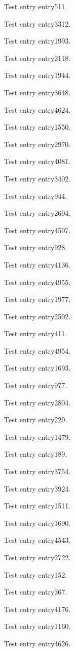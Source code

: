 Test entry \gls{entry511}.

Test entry \gls{entry3312}.

Test entry \gls{entry1993}.

Test entry \gls{entry2118}.

Test entry \gls{entry1944}.

Test entry \gls{entry3648}.

Test entry \gls{entry4624}.

Test entry \gls{entry1550}.

Test entry \gls{entry2970}.

Test entry \gls{entry4081}.

Test entry \gls{entry3402}.

Test entry \gls{entry944}.

Test entry \gls{entry2604}.

Test entry \gls{entry4507}.

Test entry \gls{entry928}.

Test entry \gls{entry4136}.

Test entry \gls{entry4955}.

Test entry \gls{entry1977}.

Test entry \gls{entry2502}.

Test entry \gls{entry411}.

Test entry \gls{entry4954}.

Test entry \gls{entry1693}.

Test entry \gls{entry977}.

Test entry \gls{entry2804}.

Test entry \gls{entry229}.

Test entry \gls{entry1479}.

Test entry \gls{entry189}.

Test entry \gls{entry3754}.

Test entry \gls{entry3924}.

Test entry \gls{entry1511}.

Test entry \gls{entry1690}.

Test entry \gls{entry4543}.

Test entry \gls{entry2722}.

Test entry \gls{entry152}.

Test entry \gls{entry367}.

Test entry \gls{entry4176}.

Test entry \gls{entry1160}.

Test entry \gls{entry4626}.


